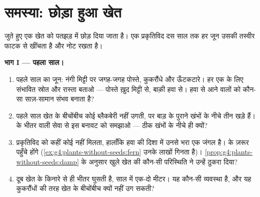 \section{समस्या: छोड़ा हुआ खेत}

\begin{problem}\label{pb:g6:how-plants-spread:1}
जुते हुए एक खेत को पतझड़ में छोड़ दिया जाता है। एक प्रकृतिविद दस साल तक
हर जून उसकी तस्वीर फाटक से खींचता है और नोट रखता है।

\medskip\noindent\textbf{भाग I --- पहला साल।}
\begin{enumerate}
  \item पहले साल का जून: नंगी मिट्टी पर जगह-जगह पोस्ते, कुकरौंधे और
        ऊँटकटारे। हर एक के लिए संभावित स्रोत और रास्ता बताओ ---
        पोस्ते ख़ुद मिट्टी से, बाक़ी हवा से। हवा से आने वालों को
        कौन-सा साज़-सामान संभव बनाता है?
  \item पहले साल खेत के बीचोंबीच कोई ब्लैकबेरी नहीं उगती, पर बाड़ के
        पुराने खंभों के नीचे तीन  खड़े हैं।  के भीतर वाली सेवा
        से इस बनावट को समझाओ --- ठीक खंभों के नीचे ही क्यों?
  \item प्रकृतिविद को कहीं कोई  नहीं मिलता, हालाँकि हवा की दिशा में
        उनसे भरा एक जंगल है।  के  ज़रूर पहुँचे होंगे
        (\cref{ex:g4:plants-without-seeds:fern} उनके लाखों गिनता है)।
        \cref{prop:g4:plants-without-seeds:damp} के अनुसार खुले खेत की
        कौन-सी परिस्थिति ने उन्हें ठुकरा दिया?
  \item दूब खेत के किनारे से ही भीतर घुसती है, साल में एक-दो मीटर। यह
        कौन-सी  व्यवस्था है, और यह कुकरौंधों की तरह खेत के
        बीचोंबीच क्यों नहीं उग सकती?
\end{enumerate}


\end{problem}
